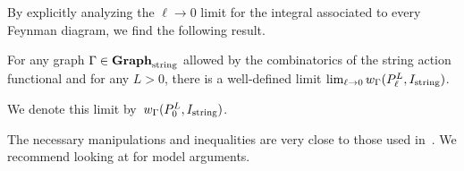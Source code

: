 \subsubsection{}

By explicitly analyzing the $\ell \to 0$ limit for the integral associated to every Feynman diagram,
we find the following result.

\begin{prop}
For any graph $\Gamma \in {\bf Graph}_{\rm string}$ allowed by the combinatorics of the string action functional and for any $L > 0$,
there is a well-defined limit $\lim_{\ell \to 0} w_{\Gamma}(P_{\ell}^L,I_{\rm string})$.
\end{prop}

We denote this limit by~$w_{\Gamma}(P_{0}^L,I_{\rm string})$.

The necessary manipulations and inequalities are very close to those used in~\cite{}.
We recommend looking at  for model arguments.


